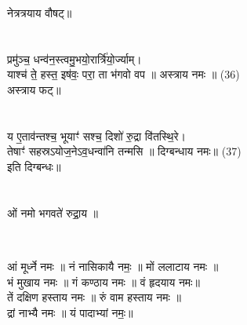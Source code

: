 {\small नेत्रत्रयाय वौषट्॥}\\
{\small{}}\\
\\
प्रमु॑ञ्च॒ धन्व॑न॒स्त्वमु॒भयो॒रार्त्रि॑यो॒र्ज्याम्। \\
याश्च॑ ते॒ हस्त॒ इष॑वः॒ परा॒ ता भ॑गवो वप ॥ अस्त्राय नमः ॥ (36)\\
{\small अस्त्राय फट्॥}\\
{\small{}}\\
\\
य ए॒ताव॑न्तश्च॒ भूयाꣳ॑ सश्च॒ दिशो॑ रु॒द्रा वि॑तस्थि॒रे।\\
तेषाꣳ॑ सहस्रऽयोज॒नेऽव॒धन्वा॑नि तन्मसि ॥ दिग्बन्धाय नमः॥ (37)\\
{\small  इति दिग्बन्धः॥}\\
{\small{}}\\
\\
ओं नमो भगवते॑ रुद्रा॒य ॥\\
\subsection{}
\\
आं मूर्ध्ने नमः ॥ नं नासिकायै नमः॒ ॥ मों ललाटाय नमः ॥\\
भं मुखाय नमः ॥ गं कण्ठाय नमः ॥  वं हृदयाय नमः॥\\
तें दक्षिण हस्ताय नमः ॥  रुं वाम हस्ताय नमः ॥\\
द्रां नाभ्यै नमः ॥ यं पादाभ्यां नमः॒॥\\
\\
